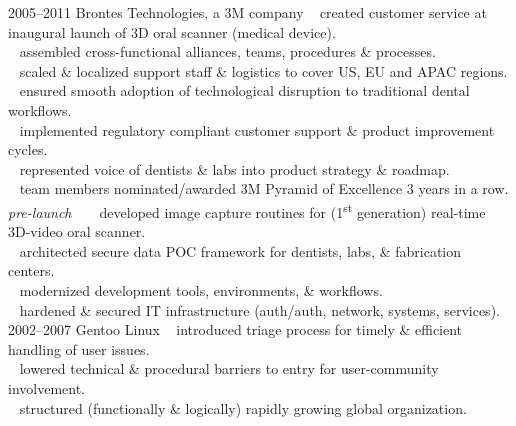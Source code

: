 \documentclass[]{friggeri-cv} %
\begin{document}
\begin{entrylist}
\entry
{2005--2011}
{Brontes Technologies, a 3M company}
{}
{{\tiny {}} ~ created customer service at inaugural launch of 3D oral scanner (medical device).\\
{\tiny {}} ~ assembled cross-functional alliances, teams, procedures \& processes.\\
{\tiny {}} ~ scaled \& localized support staff \& logistics to cover US, EU and APAC regions.\\

{\tiny {}} ~ ensured smooth adoption of technological disruption to traditional dental workflows.\\
{\tiny {}} ~ implemented regulatory compliant customer support \& product improvement cycles.\\
{\tiny {}} ~ represented voice of dentists \& labs into product strategy \& roadmap.\\

{\tiny {}} ~ team members nominated/awarded 3M Pyramid of Excellence 3 years in a row.%
}
\entry
{\emph{pre-launch}}
{~}
{}
{{\tiny {}} ~ developed image capture routines for (1\textsuperscript{st} generation) real-time 3D-video oral scanner.\\
{\tiny {}} ~ architected secure data POC framework for dentists, labs, \& fabrication centers.\\
{\tiny {}} ~ modernized development tools, environments, \& workflows.\\
{\tiny {}} ~ hardened \& secured IT infrastructure (auth/auth, network, systems, services).\\}
\entry
{2002--2007}
{Gentoo Linux}
{}
{{\tiny {}} ~ introduced triage process for timely \& efficient handling of user issues.\\
{\tiny {}} ~ lowered technical \& procedural barriers to entry for user-community involvement.\\
{\tiny {}} ~ structured (functionally \& logically) rapidly growing global organization.\\

}
\end{entrylist}
\end{document}
